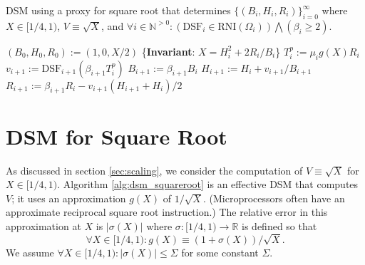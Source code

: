 \documentclass[10pt]{article}
\theoremstyle{definition}
\theoremstyle{remark}
\numberwithin{equation}{section}
\newcommand{\assign}{:=}
\newcommand{\dsf}{\text{DSF}}
\newcommand{\rni}[1]{\text{RNI}({#1})}
\newcommand{\pnats}{\mathbb{N}^{>0}}
\newcommand{\reals}{\mathbb{R}}
\newcommand{\abs}[1]{\lvert #1 \rvert}
\begin{document}
\begin{algorithm}[t]
	\caption{DSM using a proxy for square root that determines $\{(B_i, H_i, R_i)\}_{i=0}^\infty$ where $X \in [1/4,1)$, $V \equiv \sqrt{X}$, and $\forall i \in \pnats: (\dsf_i \in \rni{\Omega_i}) \bigwedge (\beta_i \ge 2)$.\label{alg:dsm_squareroot}}
	\begin{algorithmic}[0] %
		\State $(B_0, H_0, R_0) \assign (1, 0, X/2)$
		\For{$i \assign 0,1,2,\ldots$}
		\State \{\textbf{Invariant}: $X = H_i^2 + 2R_i/B_i$\}
		\State $T^p_i \assign \mu_i g(X) R_i$
		\State $v_{i+1} \assign \dsf_{i+1}(\beta_{i+1} T^p_i)$
		\State $B_{i+1} \assign \beta_{i+1} B_{i}$
		\State $H_{i+1} \assign H_{i} + v_{i+1}/B_{i+1}$
		\State $R_{i+1} \assign \beta_{i+1} R_{i} - v_{i+1} (H_{i+1} + H_i)/2$
		\EndFor
		\EndProcedure
	\end{algorithmic}
\end{algorithm}



\section{DSM for Square Root\label{sec:dsm_squareroot}}

As discussed in section \ref{sec:scaling}, we consider the computation of $V \equiv \sqrt{X}$ for $X\in[1/4,1)$. Algorithm \ref{alg:dsm_squareroot} is an effective DSM that computes $V$; it uses an approximation $g(X)$ of $1/\sqrt{X}$. (Microprocessors often have an approximate reciprocal square root instruction.)
The relative error in this approximation at $X$ is $\abs{\sigma(X)}$ where $\sigma : [1/4,1) \rightarrow \reals$ is defined so that
\[
\forall X \in [1/4,1): g(X) \equiv (1+\sigma(X))/\sqrt{X} .
\]
We assume $\forall X \in [1/4,1): \abs{\sigma(X)} \le \Sigma$ for some constant $\Sigma$.
\end{document}
